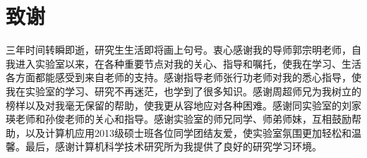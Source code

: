 %
%


%
%
\renewcommand{\baselinestretch}{1.5}
\fontsize{12pt}{13pt}\selectfont

\chapter*{致谢}
{}

三年时间转瞬即逝，研究生生活即将画上句号。衷心感谢我的导师郭宗明老师，自我进入实验室以来，在各种重要节点对我的关心、指导和嘱托，使我在学习、生活各方面都能感受到来自老师的支持。感谢指导老师张行功老师对我的悉心指导，使我在实验室的学习、研究不再迷茫，也学到了很多知识。感谢周超师兄为我树立的榜样以及对我毫无保留的帮助，使我更从容地应对各种困难。感谢同实验室的刘家瑛老师和孙俊老师的关心和指导。感谢实验室的师兄同学、师弟师妹，互相鼓励帮助，以及计算机应用2013级硕士班各位同学团结友爱，使实验室氛围更加轻松和温馨。最后，感谢计算机科学技术研究所为我提供了良好的研究学习环境。
